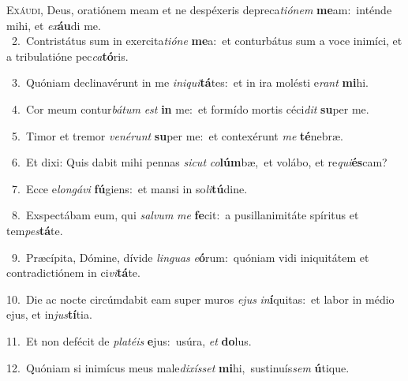 \lettrine{\initial\textcolor{\initialcolor}{E}}{xáudi,} Deus, oratiónem meam et ne despéxeris depreca\-\textit{ti}\-\textit{ó}\textit{nem} \textbf{me}\-am:~\star inténde mihi, et \textit{ex}\-\textbf{áu}di me.\\
{\numbfont\textcolor{\numbcolor}{~2.}}~Contristátus sum in exercita\-\textit{ti}\-\textit{ó}\textit{ne} \textbf{me}\-a:~\star et conturbátus sum a voce inimíci, et a tribulatióne pec\-\textit{ca}\-\textbf{tó}ris.\par
{\numbfont\textcolor{\numbcolor}{~3.}}~Quóniam declinavérunt in me \textit{in}\-\textit{i}\textit{qui}\textbf{tá}tes:~\star et in ira molésti e\textit{rant} \textbf{mi}\-hi.\par
{\numbfont\textcolor{\numbcolor}{~4.}}~Cor meum contur\-\textit{bá}\-\textit{tum} \textit{est} \textbf{in} me:~\star et formído mortis céci\textit{dit} \textbf{su}\-per me.\par
{\numbfont\textcolor{\numbcolor}{~5.}}~Timor et tremor \textit{ve}\-\textit{né}\textit{runt} \textbf{su}\-per me:~\star et contexérunt \textit{me} \textbf{té}\-nebræ.\par
{\numbfont\textcolor{\numbcolor}{~6.}}~Et dixi: Quis dabit mihi pennas \textit{sic}\-\textit{ut} \textit{co}\-\textbf{lúm}bæ,~\star et volábo, et re\-\textit{qui}\-\textbf{és}cam?\par
{\numbfont\textcolor{\numbcolor}{~7.}}~Ecce e\-\textit{lon}\-\textit{gá}\textit{vi} \textbf{fú}\-giens:~\star et mansi in so\-\textit{li}\-\textbf{tú}dine.\par
{\numbfont\textcolor{\numbcolor}{~8.}}~Exspectábam eum, qui \textit{sal}\-\textit{vum} \textit{me} \textbf{fe}\-cit:~\star a pusillanimitáte spíritus et tem\-\textit{pes}\-\textbf{tá}te.\par
{\numbfont\textcolor{\numbcolor}{~9.}}~Præcípita, Dómine, dívide \textit{lin}\-\textit{guas} \textit{e}\-\textbf{ó}rum:~\star quóniam vidi iniquitátem et contradictiónem in ci\-\textit{vi}\-\textbf{tá}te.\par
{\numbfont\textcolor{\numbcolor}{10.}}~Die ac nocte circúmdabit eam super muros \textit{e}\-\textit{jus} \textit{in}\-\textbf{í}quitas:~\star et labor in médio ejus, et in\-\textit{jus}\-\textbf{tí}tia.\par
{\numbfont\textcolor{\numbcolor}{11.}}~Et non defécit de \textit{pla}\-\textit{té}\textit{is} \textbf{e}\-jus:~\star usúra, \textit{et} \textbf{do}\-lus.\par
{\numbfont\textcolor{\numbcolor}{12.}}~Quóniam si inimícus meus male\-\textit{di}\-\textit{xís}\textit{set} \textbf{mi}\-hi,~\star sustinuís\textit{sem} \textbf{ú}\-tique.\par
